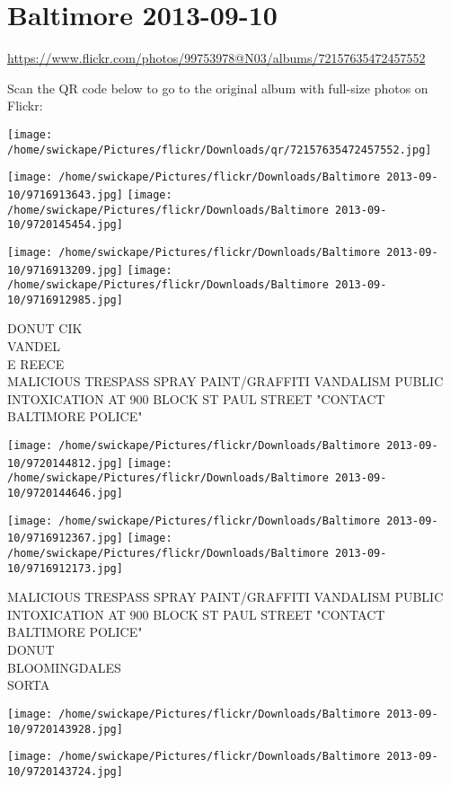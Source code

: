 \documentclass[10pt,letterpaper]{article}
\title{}
\author{}
\date{}
\begin{document}
\section*{Baltimore 2013-09-10}

\url{https://www.flickr.com/photos/99753978@N03/albums/72157635472457552}

Scan the QR code below to go to the original album with full-size photos on Flickr:

\texttt{[image: /home/swickape/Pictures/flickr/Downloads/qr/72157635472457552.jpg]}
\pagebreak

\texttt{[image: /home/swickape/Pictures/flickr/Downloads/Baltimore 2013-09-10/9716913643.jpg]}
\texttt{[image: /home/swickape/Pictures/flickr/Downloads/Baltimore 2013-09-10/9720145454.jpg]}

\texttt{[image: /home/swickape/Pictures/flickr/Downloads/Baltimore 2013-09-10/9716913209.jpg]}
\texttt{[image: /home/swickape/Pictures/flickr/Downloads/Baltimore 2013-09-10/9716912985.jpg]}

DONUT CIK\\
VANDEL\\
E REECE\\
MALICIOUS TRESPASS SPRAY PAINT/GRAFFITI VANDALISM PUBLIC INTOXICATION AT 900 BLOCK ST PAUL STREET "CONTACT BALTIMORE POLICE"
\pagebreak

\texttt{[image: /home/swickape/Pictures/flickr/Downloads/Baltimore 2013-09-10/9720144812.jpg]}
\texttt{[image: /home/swickape/Pictures/flickr/Downloads/Baltimore 2013-09-10/9720144646.jpg]}

\texttt{[image: /home/swickape/Pictures/flickr/Downloads/Baltimore 2013-09-10/9716912367.jpg]}
\texttt{[image: /home/swickape/Pictures/flickr/Downloads/Baltimore 2013-09-10/9716912173.jpg]}

MALICIOUS TRESPASS SPRAY PAINT/GRAFFITI VANDALISM PUBLIC INTOXICATION AT 900 BLOCK ST PAUL STREET "CONTACT BALTIMORE POLICE"\\
DONUT\\
BLOOMINGDALES\\
SORTA
\pagebreak

\texttt{[image: /home/swickape/Pictures/flickr/Downloads/Baltimore 2013-09-10/9720143928.jpg]}

\vspace{0.25in}
\texttt{[image: /home/swickape/Pictures/flickr/Downloads/Baltimore 2013-09-10/9720143724.jpg]}
\end{document}
